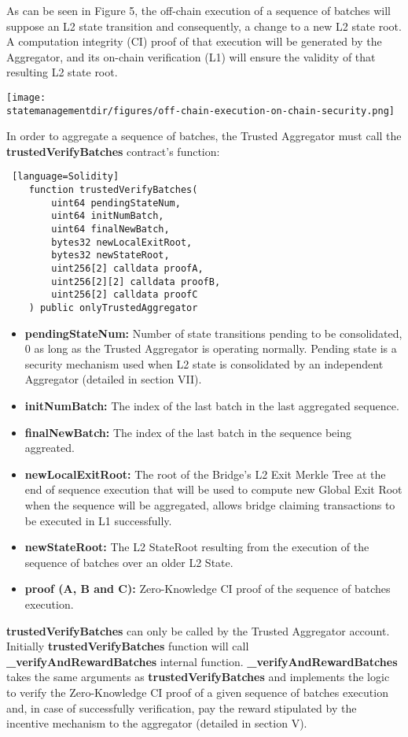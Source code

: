 As can be seen in Figure 5, the off-chain execution of a sequence of batches will suppose an L2 state transition and consequently, a change to a new L2 state root. A computation integrity (CI) proof of that execution will be generated by the Aggregator, and its on-chain verification (L1) will ensure the validity of that resulting L2 state root.

\begin{center}
	\texttt{[image: \\statemanagementdir/figures/off-chain-execution-on-chain-security.png]}
\end{center}



In order to aggregate a sequence of batches, the Trusted Aggregator must call the \textbf{trustedVerifyBatches} contract's function:

\begin{lstlisting} [language=Solidity]
	function trustedVerifyBatches(
		uint64 pendingStateNum,
		uint64 initNumBatch,
		uint64 finalNewBatch,
		bytes32 newLocalExitRoot,
		bytes32 newStateRoot,
		uint256[2] calldata proofA,
		uint256[2][2] calldata proofB,
		uint256[2] calldata proofC
	) public onlyTrustedAggregator 
\end{lstlisting}

\begin{itemize}
	\item \textbf{pendingStateNum:} Number of state transitions pending to be consolidated, 0 as long as the Trusted Aggregator is operating normally. Pending state is a security mechanism used when L2 state is consolidated by an independent Aggregator (detailed in section VII).
	\item \textbf{initNumBatch:} The index of the last batch in the last aggregated sequence.
	\item \textbf{finalNewBatch:} The index of the last batch in the sequence being aggreated.
	\item \textbf{newLocalExitRoot:} The root of the Bridge's L2 Exit Merkle Tree at the end of sequence execution that will be used to compute new Global Exit Root when the sequence will be aggregated, allows bridge claiming transactions to be executed in L1 successfully.
	\item \textbf{newStateRoot:} The L2 StateRoot resulting from the execution of the sequence of batches over an older L2 State.
	\item \textbf{proof (A, B and C):} Zero-Knowledge CI proof of the sequence of batches execution.
\end{itemize}
\textbf{trustedVerifyBatches} can only be called by the Trusted Aggregator account.
Initially \textbf{trustedVerifyBatches} function will call \textbf{\_verifyAndRewardBatches} internal function. \textbf{\_verifyAndRewardBatches} takes the same arguments as \textbf{trustedVerifyBatches} and implements the logic to verify the Zero-Knowledge CI proof of a given sequence of batches execution and, in case of successfully verification, pay the reward stipulated by the incentive mechanism to the aggregator (detailed in section V).

